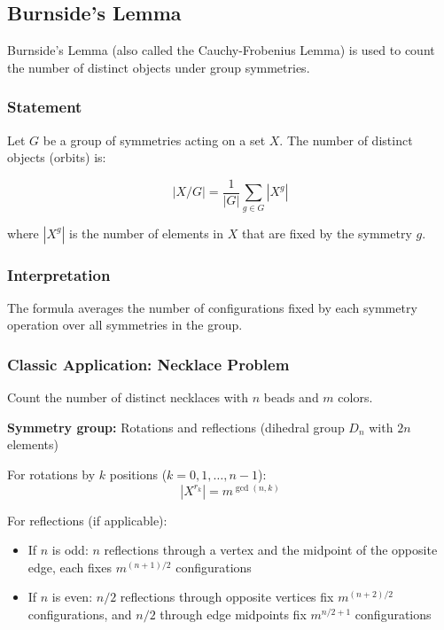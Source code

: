 \subsection{Burnside's Lemma}

Burnside's Lemma (also called the Cauchy-Frobenius Lemma) is used to count the number of distinct objects under group symmetries.

\subsubsection{Statement}

Let $G$ be a group of symmetries acting on a set $X$. The number of distinct objects (orbits) is:

\begin{equation}
    |X/G| = \frac{1}{|G|} \sum_{g \in G} |X^g|
\end{equation}

where $|X^g|$ is the number of elements in $X$ that are fixed by the symmetry $g$.

\subsubsection{Interpretation}

The formula averages the number of configurations fixed by each symmetry operation over all symmetries in the group.

\subsubsection{Classic Application: Necklace Problem}

Count the number of distinct necklaces with $n$ beads and $m$ colors.

\textbf{Symmetry group:} Rotations and reflections (dihedral group $D_n$ with $2n$ elements)

For rotations by $k$ positions ($k = 0, 1, \ldots, n-1$):
\begin{equation}
    |X^{r_k}| = m^{\gcd(n,k)}
\end{equation}

For reflections (if applicable):
\begin{itemize}
    \item If $n$ is odd: $n$ reflections through a vertex and the midpoint of the opposite edge, each fixes $m^{(n+1)/2}$ configurations
    \item If $n$ is even: $n/2$ reflections through opposite vertices fix $m^{(n+2)/2}$ configurations, and $n/2$ through edge midpoints fix $m^{n/2+1}$ configurations
\end{itemize}

